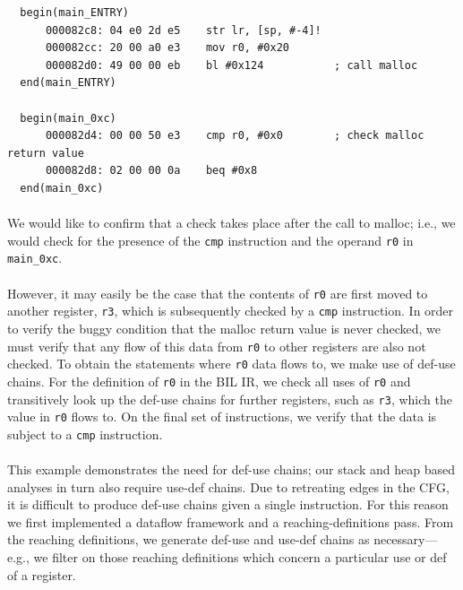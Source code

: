 \documentclass[letterpaper,11pt]{article}
\begin{document}
\begin{center}
\lstset{language=C, label=mallocdisasm,
caption=Malloc disassembly, breaklines=true, basicstyle=\tiny, numbers=none}
\begin{lstlisting}
  begin(main_ENTRY)
      000082c8: 04 e0 2d e5    str lr, [sp, #-4]!
      000082cc: 20 00 a0 e3    mov r0, #0x20
      000082d0: 49 00 00 eb    bl #0x124           ; call malloc
  end(main_ENTRY)

  begin(main_0xc)
      000082d4: 00 00 50 e3    cmp r0, #0x0        ; check malloc return value
      000082d8: 02 00 00 0a    beq #0x8
  end(main_0xc)
\end{lstlisting}
\label{fig:malloc}
\end{center}

\paragraph{}
We would like to confirm that a check takes place after the call to malloc;
i.e., we would check for the presence of the \texttt{cmp} instruction and the
operand \texttt{r0} in \texttt{main\_0xc}.

\paragraph{}
However, it may easily be the case that the contents of \texttt{r0} are first
moved to another register, \texttt{r3}, which is subsequently checked by a
\texttt{cmp} instruction. In order to verify the buggy condition that the malloc
return value is never checked, we must verify that any flow of this data from
\texttt{r0} to other registers are also not checked. To obtain the statements
where \texttt{r0} data flows to, we make use of def-use chains. For the
definition of \texttt{r0} in the BIL IR, we check all uses of \texttt{r0} and
transitively look up the def-use chains for further registers, such as
\texttt{r3}, which the value in \texttt{r0} flows to. On the final set of
instructions, we verify that the data is subject to a \texttt{cmp} instruction.

\paragraph{}
This example demonstrates the need for def-use chains; our stack and heap based
analyses in turn also require use-def chains. Due to retreating edges in the
CFG, it is difficult to produce def-use chains given a single instruction. For
this reason we first implemented a dataflow framework and a
reaching-definitions pass. From the reaching definitions, we generate def-use
and use-def chains as necessary---e.g., we filter on those reaching definitions
which concern a particular use or def of a register.
\end{document}
